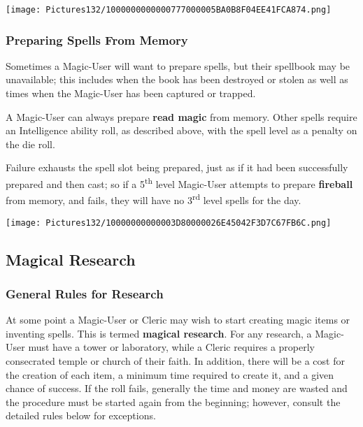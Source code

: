 \documentclass[a4paper,twoside,openany,10pt]{book}
\begin{document}
\begin{multicols}{2}
 \begin{center}
 	\texttt{[image: Pictures132/1000000000000777000005BA0B8F04EE41FCA874.png]} 
 \end{center}

\subsubsection{Preparing Spells From Memory}\label{preparing-spells-from-memory}

Sometimes a Magic-User will want to prepare spells, but their spellbook may be unavailable; this includes when the book has been destroyed or stolen as well as times when the Magic-User has been captured or trapped.

A Magic-User can always prepare \textbf{read magic} from memory. Other spells require an Intelligence ability roll, as described above, with the spell level as a penalty on the die roll.

Failure exhausts the spell slot being prepared, just as if it had been successfully prepared and then cast; so if a 5\textsuperscript{th} level Magic-User attempts to prepare \textbf{fireball} from memory, and fails, they will have no 3\textsuperscript{rd} level spells for the day.

\begin{center}
	\texttt{[image: Pictures132/10000000000003D80000026E45042F3D7C67FB6C.png]}
\end{center}

\subsection{Magical Research}\label{magical-research}

\subsubsection{General Rules for Research}\label{general-rules-for-research}

At some point a Magic-User or Cleric may wish to start creating magic items or inventing spells. This is termed \textbf{magical research}. For any research, a Magic-User must have a tower or laboratory, while a Cleric requires a properly consecrated temple or church of their faith. In addition, there will be a cost for the creation of each item, a minimum time required to create it, and a given chance of success. If the roll fails, generally the time and money are wasted and the procedure must be started again from the beginning; however, consult the detailed rules below for exceptions.


\end{multicols}
\end{document}
